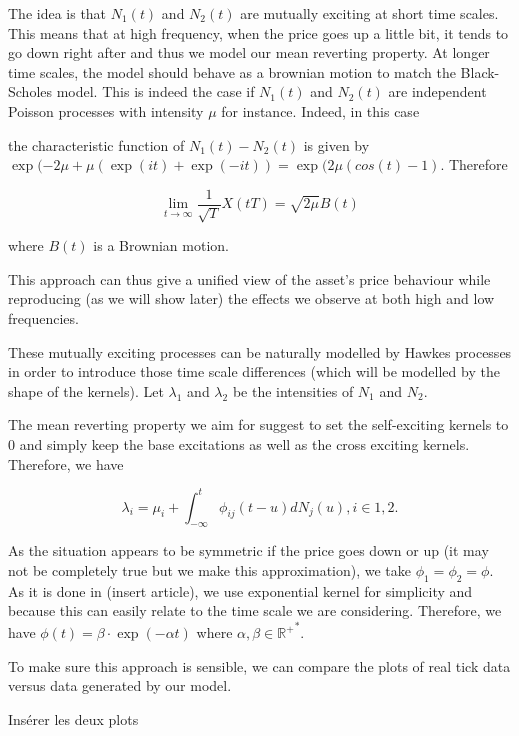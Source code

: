 \documentclass[a4paper,12pt,twoside]{article}
\begin{document}
The idea is that $N_1(t)$ and $N_2(t)$ are mutually exciting at short time scales. This means that at high frequency, when the price goes up a little bit, it tends to go down right after and thus we model our mean reverting property. At longer time scales, the model should behave as a brownian motion to match the Black-Scholes model. This is indeed the case if $N_1(t)$ and $N_2(t)$ are independent Poisson processes with intensity $\mu$ for instance.
Indeed, in this case 

the characteristic function of $N_1(t) - N_2(t)$ is given by $\exp(-2\mu + \mu(\exp(it) + \exp(-it)) = \exp(2\mu(cos(t) - 1)$. Therefore 

\begin{equation}
\lim_{t \to \infty} \frac{1}{\sqrt{T}}X(tT) = \sqrt{2\mu}B(t)
\end{equation}

where $B(t)$ is a Brownian motion.

This approach can thus give a unified view of the asset's price behaviour while reproducing (as we will show later) the effects we observe at both high and low frequencies.

These mutually exciting processes can be naturally modelled by Hawkes processes in order to introduce those time scale differences (which will be modelled by the shape of the kernels). Let $\lambda_1$ and $\lambda_2$ be the intensities of $N_1$ and $N_2$. 

The mean reverting property we aim for suggest to set the self-exciting kernels to 0 and simply keep the base excitations as well as the cross exciting kernels. Therefore, we have 

\begin{equation} \lambda_i = \mu_i + \int_{-\infty}^{t} \phi_{ij}(t-u)dN_j(u), i \in {1, 2}.
\end{equation}

As the situation appears to be symmetric if the price goes down or up (it may not be completely true but we make this approximation), we take $\phi_1 = \phi_2 = \phi$. As it is done in (insert article), we use exponential kernel for simplicity and because this can easily relate to the time scale we are considering. Therefore, we have $\phi(t) = \beta \cdot \exp(-\alpha t)$ where $\alpha, \beta \in \mathbb{{R^{+}}^*}$.

To make sure this approach is sensible, we can compare the plots of real tick data versus data generated by our model. 

Insérer les deux plots
\end{document}
